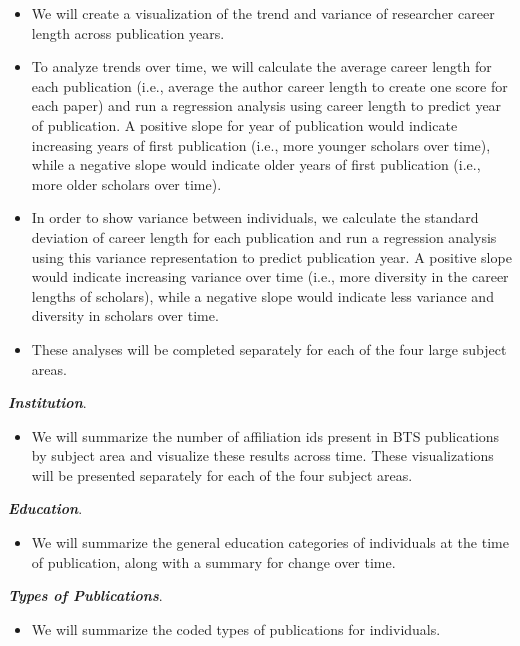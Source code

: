 \documentclass[
  man]{apa7}
\providecommand{\tightlist}{%
  \setlength{\itemsep}{0pt}\setlength{\parskip}{0pt}}
\begin{document}
\begin{itemize}
\tightlist
\item
  We will create a visualization of the trend and variance of
  researcher career length across publication years.
\item
  To analyze trends over time, we will calculate the average career
  length for each publication (i.e., average the author career length
  to create one score for each paper) and run a regression analysis
  using career length to predict year of publication. A positive slope
  for year of publication would indicate increasing years of first
  publication (i.e., more younger scholars over time), while a
  negative slope would indicate older years of first publication
  (i.e., more older scholars over time).
\item
  In order to show variance between individuals, we calculate the
  standard deviation of career length for each publication and run a
  regression analysis using this variance representation to predict
  publication year. A positive slope would indicate increasing
  variance over time (i.e., more diversity in the career lengths of
  scholars), while a negative slope would indicate less variance and
  diversity in scholars over time.
\item
  These analyses will be completed separately for each of the four
  large subject areas.
\end{itemize}

\textbf{\emph{Institution}}.

\begin{itemize}
\tightlist
\item
  We will summarize the number of affiliation ids present in BTS
  publications by subject area and visualize these results across
  time. These visualizations will be presented separately for each of
  the four subject areas.
\end{itemize}

\textbf{\emph{Education}}.

\begin{itemize}
\tightlist
\item
  We will summarize the general education categories of individuals at
  the time of publication, along with a summary for change over time.
\end{itemize}

\textbf{\emph{Types of Publications}}.

\begin{itemize}
\tightlist
\item
  We will summarize the coded types of publications for individuals.
\end{itemize}
\end{document}
